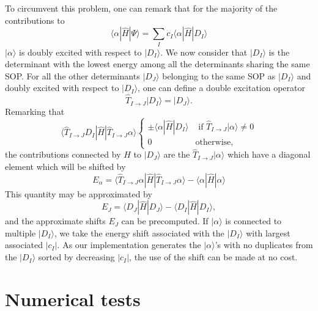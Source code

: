 \documentclass[aip,jcp,reprint,showkeys]{revtex4-1}
\newcommand{\ket}[1]{|#1\rangle}
\newcommand{\sop}{SOP}
\newcommand{\mel}[3]{\langle #1 | #2 | #3 \rangle}
\begin{document}
To circumvent this problem, one can remark that for the majority of the
contributions to
\begin{equation}
 \mel{\alpha}{\hat{H}}{\Psi} = \sum_I c_I \mel{\alpha}{\hat{H}}{D_I}
\end{equation}
$\ket{\alpha}$ is doubly excited with respect to $\ket{D_I}$.
We now consider that $\ket{D_I}$ is the determinant with the lowest
energy among all the determinants sharing the same \sop .
For all the other determinants $\ket{D_J}$ belonging to the same \sop{}
as $\ket{D_I}$ and doubly excited with respect to $\ket{D_I}$, one can define
a double excitation operator
\begin{equation}
\hat{T}_{I\rightarrow J} \ket{D_I} = \ket{D_J}.
\end{equation}
Remarking that 
\begin{equation}
\mel{\hat{T}_{I\rightarrow J} D_I}{\hat{H}}{\hat{T}_{I\rightarrow J} \alpha} 
\begin{cases}
\pm \mel{\alpha}{\hat{H}}{D_I} & \text{ if } \hat{T}_{I\rightarrow J}\ket{\alpha} \ne 0 \\
0 & \text{otherwise},
\end{cases}
\end{equation}
the contributions connected by $\hat{H}$ to $\ket{D_J}$ are the
$\hat{T}_{I\rightarrow J} \ket{\alpha}$ which have a diagonal element which
will be shifted by 
\begin{equation}
E_\alpha = \langle \hat{T}_{I\rightarrow J} \alpha | \hat{H} | \hat{T}_{I\rightarrow J} \alpha \rangle - \langle \alpha | \hat{H} | \alpha \rangle
\end{equation}
This quantity may be approximated by
\begin{equation}
E_J = \langle D_J | \hat{H} | D_J \rangle - \langle D_I | \hat{H} | D_I \rangle,
\end{equation}
and the approximate shifts $E_J$ can be precomputed.
If $\ket{\alpha}$ is connected to multiple $\ket{D_I}$, we take the energy
shift associated with the $\ket{D_I}$ with largest associated $|c_I|$.  As our
implementation generates the $\ket{\alpha}$'s with no duplicates from the
$\ket{D_I}$ sorted by decreasing $|c_I|$, the use of the shift can be made at
no cost.





\section{Numerical tests}
\end{document}

